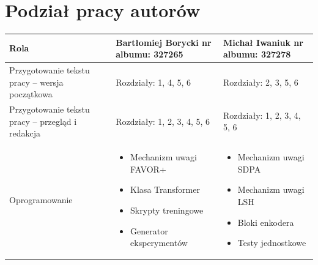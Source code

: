\documentclass[a4paper,11pt,twoside]{report}
\theoremstyle{definition}
\begin{document}
\tableofcontents
\thispagestyle{empty}



\newpage


\section*{Podział pracy autorów}
\vspace{3pt}

\begin{table}[!h]
\centering
\label{tab:podzial-prac}
\small
\begin{tabular}{|
    >{\raggedright\arraybackslash}p{5.6cm}|
    >{\raggedright\arraybackslash}p{4.2cm}|
    >{\raggedright\arraybackslash}p{4.2cm}|
}
\hline
\textbf{Rola} &
\textbf{Bartłomiej Borycki \newline nr albumu: 327265} &
\textbf{Michał Iwaniuk \newline nr albumu: 327278} \\
\hline

Przygotowanie tekstu pracy -- wersja początkowa &
Rozdziały: 1, 4, 5, 6 &
Rozdziały: 2, 3, 5, 6 \\
\hline

Przygotowanie tekstu pracy -- przegląd i redakcja &
Rozdziały: 1, 2, 3, 4, 5, 6 &
Rozdziały: 1, 2, 3, 4, 5, 6 \\
\hline

Oprogramowanie &
\begin{itemize}[leftmargin=*, nosep]
    \item Mechanizm uwagi FAVOR+
    \item Klasa Transformer
    \item Skrypty treningowe
    \item Generator eksperymentów
\end{itemize} &
\begin{itemize}[leftmargin=*, nosep]
    \item Mechanizm uwagi SDPA
    \item Mechanizm uwagi LSH
    \item Bloki enkodera
    \item Testy jednostkowe
\end{itemize} \\
\hline


\end{tabular}
\end{table}
\end{document}
